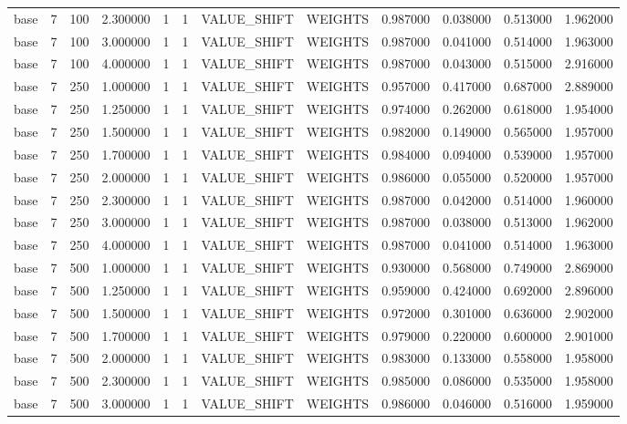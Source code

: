 \begin{tabular}{lrrrllllrrrr}
base & 7 & 100 & 2.300000 & 1 & 1 & VALUE_SHIFT & WEIGHTS & 0.987000 & 0.038000 & 0.513000 & 1.962000 \\
base & 7 & 100 & 3.000000 & 1 & 1 & VALUE_SHIFT & WEIGHTS & 0.987000 & 0.041000 & 0.514000 & 1.963000 \\
base & 7 & 100 & 4.000000 & 1 & 1 & VALUE_SHIFT & WEIGHTS & 0.987000 & 0.043000 & 0.515000 & 2.916000 \\
base & 7 & 250 & 1.000000 & 1 & 1 & VALUE_SHIFT & WEIGHTS & 0.957000 & 0.417000 & 0.687000 & 2.889000 \\
base & 7 & 250 & 1.250000 & 1 & 1 & VALUE_SHIFT & WEIGHTS & 0.974000 & 0.262000 & 0.618000 & 1.954000 \\
base & 7 & 250 & 1.500000 & 1 & 1 & VALUE_SHIFT & WEIGHTS & 0.982000 & 0.149000 & 0.565000 & 1.957000 \\
base & 7 & 250 & 1.700000 & 1 & 1 & VALUE_SHIFT & WEIGHTS & 0.984000 & 0.094000 & 0.539000 & 1.957000 \\
base & 7 & 250 & 2.000000 & 1 & 1 & VALUE_SHIFT & WEIGHTS & 0.986000 & 0.055000 & 0.520000 & 1.957000 \\
base & 7 & 250 & 2.300000 & 1 & 1 & VALUE_SHIFT & WEIGHTS & 0.987000 & 0.042000 & 0.514000 & 1.960000 \\
base & 7 & 250 & 3.000000 & 1 & 1 & VALUE_SHIFT & WEIGHTS & 0.987000 & 0.038000 & 0.513000 & 1.962000 \\
base & 7 & 250 & 4.000000 & 1 & 1 & VALUE_SHIFT & WEIGHTS & 0.987000 & 0.041000 & 0.514000 & 1.963000 \\
base & 7 & 500 & 1.000000 & 1 & 1 & VALUE_SHIFT & WEIGHTS & 0.930000 & 0.568000 & 0.749000 & 2.869000 \\
base & 7 & 500 & 1.250000 & 1 & 1 & VALUE_SHIFT & WEIGHTS & 0.959000 & 0.424000 & 0.692000 & 2.896000 \\
base & 7 & 500 & 1.500000 & 1 & 1 & VALUE_SHIFT & WEIGHTS & 0.972000 & 0.301000 & 0.636000 & 2.902000 \\
base & 7 & 500 & 1.700000 & 1 & 1 & VALUE_SHIFT & WEIGHTS & 0.979000 & 0.220000 & 0.600000 & 2.901000 \\
base & 7 & 500 & 2.000000 & 1 & 1 & VALUE_SHIFT & WEIGHTS & 0.983000 & 0.133000 & 0.558000 & 1.958000 \\
base & 7 & 500 & 2.300000 & 1 & 1 & VALUE_SHIFT & WEIGHTS & 0.985000 & 0.086000 & 0.535000 & 1.958000 \\
base & 7 & 500 & 3.000000 & 1 & 1 & VALUE_SHIFT & WEIGHTS & 0.986000 & 0.046000 & 0.516000 & 1.959000 \\

\end{tabular}
